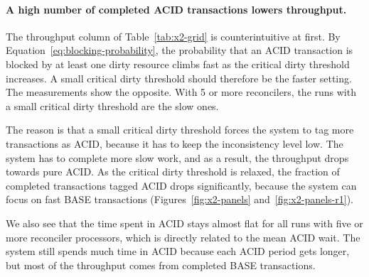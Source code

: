 \paragraph{A high number of completed ACID transactions lowers
  throughput.}\label{sec:x2-mechanism} The throughput column of
Table~\ref{tab:x2-grid} is counterintuitive at first. By
Equation~\ref{eq:blocking-probability}, the probability that an ACID transaction
is blocked by at least one dirty resource climbs fast as the critical dirty
threshold increases. A small critical dirty threshold should therefore be the
faster setting. The measurements show the opposite. With 5 or more reconcilers,
the runs with a small critical dirty threshold are the slow ones.

The reason is that a small critical dirty threshold forces the system to tag
more transactions as ACID, because it has to keep the inconsistency level low.
The system has to complete more slow work, and as a result, the throughput drops
towards pure ACID. As the critical dirty threshold is relaxed, the fraction of
completed transactions tagged ACID drops significantly, because the system can
focus on fast BASE transactions (Figures~\ref{fig:x2-panels}
and~\ref{fig:x2-panels-r1}).

We also see that the time spent in ACID stays almost flat for all runs with five
or more reconciler processors, which is directly related to the mean ACID wait.
The system still spends much time in ACID because each ACID period gets longer,
but most of the throughput comes from completed BASE transactions.

